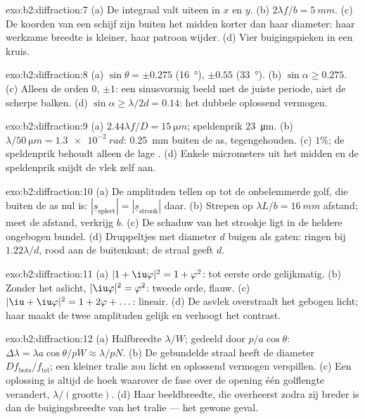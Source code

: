 \begin{solution}{exo:b2:diffraction:7}
(a) De integraal valt uiteen in $x$ en $y$. (b) $2\lambda f/b = \qty{5}{mm}$. (c) De
koorden van een schijf zijn buiten het midden korter dan haar diameter: haar
werkzame breedte is kleiner, haar patroon wijder. (d) Vier buigingspieken
in een kruis.
\end{solution}

\begin{solution}{exo:b2:diffraction:8}
(a) $\sin\theta = \pm0.275$ (\qty{16}{\degree}), $\pm0.55$
(\qty{33}{\degree}). (b) $\sin\alpha \ge 0.275$.
(c) Alleen de orden $0$, $\pm1$: een sinusvormig beeld met de juiste periode, niet
de scherpe balken. (d) $\sin\alpha \ge \lambda/2d = 0.14$: het dubbele
oplossend vermogen.
\end{solution}

\begin{solution}{exo:b2:diffraction:9}
(a) $2.44\lambda f/D = \qty{15}{\micro m}$; speldenprik \qty{23}{\micro m}.
(b) $\lambda/\qty{50}{\micro m} =
\qty{1.3e-2}{rad}$: \qty{0.25}{mm} buiten
de as, tegengehouden. (c) $1\%$; de speldenprik behoudt alleen
de lage . (d) Enkele micrometers uit het midden en de
speldenprik snijdt de vlek zelf aan.
\end{solution}

\begin{solution}{exo:b2:diffraction:10}
(a) De amplituden tellen op tot de onbelemmerde golf, die buiten de as nul is:
$|\underline s_{\text{spleet}}| = |\underline s_{\text{strook}}|$ daar. (b)
Strepen op $\lambda L/b =
\qty{16}{mm}$ afstand; meet de afstand, verkrijg
$b$. (c) De schaduw van het strookje ligt
in de heldere ongebogen bundel. (d) Druppeltjes met diameter $d$ buigen
als gaten: ringen bij $1.22\lambda/d$, rood aan de buitenkant; de straal geeft $d$.
\end{solution}

\begin{solution}{exo:b2:diffraction:11}
(a) $|1 + \iu\varphi|^2 = 1 + \varphi^2$: tot eerste orde gelijkmatig. (b)
Zonder het
aslicht, $|\iu\varphi|^2 = \varphi^2$: tweede orde, flauw. (c)
$|\iu + \iu\varphi|^2 =
1 + 2\varphi + \dots$: lineair. (d) De asvlek
overstraalt het gebogen
licht; haar  maakt de twee amplituden gelijk en verhoogt het contrast.
\end{solution}

\begin{solution}{exo:b2:diffraction:12}
(a) Halfbreedte $\lambda/W$; gedeeld door $p/a\cos\theta$:
$\Delta\lambda = \lambda a\cos\theta/pW \approx
\lambda/pN$. (b) De
gebundelde straal heeft de diameter $Df_{\text{bots}}/f_{\text{tel}}$;
een kleiner tralie zou licht en oplossend vermogen verspillen. (c) Een
oplossing is altijd de hoek waarover de fase over de
opening één golflengte verandert, $\lambda/(\text{grootte})$. (d) Haar
beeld\-breedte,
die overheerst zodra zij breder is dan de buigingsbreedte van het
tralie --- het gewone geval.
\end{solution}

